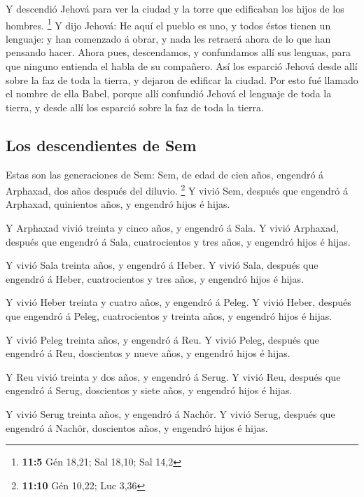  Y descendió Jehová para ver la ciudad y la torre que
edificaban los hijos de los hombres. \footnote{\textbf{11:5} Gén 18,21;
  Sal 18,10; Sal 14,2}  Y dijo Jehová: He aquí el pueblo
es uno, y todos éstos tienen un lenguaje: y han comenzado á obrar, y
nada les retraerá ahora de lo que han pensando hacer. 
Ahora pues, descendamos, y confundamos allí sus lenguas, para que
ninguno entienda el habla de su compañero.  Así los
esparció Jehová desde allí sobre la faz de toda la tierra, y dejaron de
edificar la ciudad.  Por esto fué llamado el nombre de
ella Babel, porque allí confundió Jehová el lenguaje de toda la tierra,
y desde allí los esparció sobre la faz de toda la tierra.

\hypertarget{los-descendientes-de-sem}{%
\subsection{Los descendientes de Sem}\label{los-descendientes-de-sem}}

 Estas son las generaciones de Sem: Sem, de edad de cien
años, engendró á Arphaxad, dos años después del diluvio. \footnote{\textbf{11:10}
  Gén 10,22; Luc 3,36}  Y vivió Sem, después que engendró
á Arphaxad, quinientos años, y engendró hijos é hijas.

 Y Arphaxad vivió treinta y cinco años, y engendró á
Sala.  Y vivió Arphaxad, después que engendró á Sala,
cuatrocientos y tres años, y engendró hijos é hijas.

 Y vivió Sala treinta años, y engendró á Heber.
 Y vivió Sala, después que engendró á Heber,
cuatrocientos y tres años, y engendró hijos é hijas.

 Y vivió Heber treinta y cuatro años, y engendró á Peleg.
 Y vivió Heber, después que engendró á Peleg,
cuatrocientos y treinta años, y engendró hijos é hijas.

 Y vivió Peleg treinta años, y engendró á Reu.
 Y vivió Peleg, después que engendró á Reu, doscientos y
nueve años, y engendró hijos é hijas.

 Y Reu vivió treinta y dos años, y engendró á Serug.
 Y vivió Reu, después que engendró á Serug, doscientos y
siete años, y engendró hijos é hijas.

 Y vivió Serug treinta años, y engendró á Nachôr.
 Y vivió Serug, después que engendró á Nachôr, doscientos
años, y engendró hijos é hijas.

